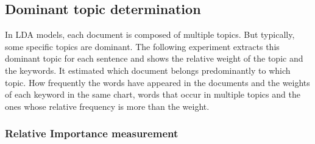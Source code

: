 \documentclass[sn-mathphys,Numbered]{sn-jnl}%
\theoremstyle{thmstyleone}%
\theoremstyle{thmstyletwo}%
\theoremstyle{thmstylethree}%
\begin{document}




\subsection{Dominant topic determination}\label{dom_topic}

In LDA models, each document is composed of multiple topics. But
typically, some specific topics are dominant. The following experiment
extracts this dominant topic for each sentence and shows the relative
weight of the topic and the keywords. It estimated which document
belongs predominantly to which topic. How frequently the words have
appeared in the documents and the weights of each keyword in the same
chart, words that occur in multiple topics and the ones whose relative
frequency is more than the weight.

\subsubsection{Relative Importance measurement}
\end{document}
